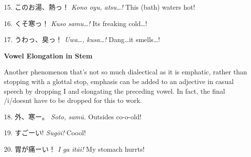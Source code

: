 \par{15. このお湯、熱っ！ \hfill\break
 \emph{Kono oyu, atsu…! }\hfill\break
This (bath) water\textquotesingle s hot! }
 
\par{16. くそ寒っ！ \hfill\break
 \emph{Kuso samu…! }\hfill\break
It\textquotesingle s freaking cold…! }
 
\par{17. うわっ、臭っ！ \hfill\break
 \emph{Uwa…, kusa…! }\hfill\break
Dang…it smells…! }
 
\begin{center}
\textbf{Vowel Elongation in Stem }
\end{center}

\par{ Another phenomenon that's not so much dialectical as it is emphatic, rather than stopping with a glottal stop, emphasis can be added to an adjective in casual speech by dropping I and elongating the preceding vowel. In fact, the final \slash i\slash  doesn\textquotesingle t have to be dropped for this to work. }
 
\par{18. 外、寒ー。 \hfill\break
 \emph{Soto, samū. }\hfill\break
Outside\textquotesingle s co-o-old! }
 
\par{19. すごーい! \hfill\break
 \emph{Sugōi! }\hfill\break
Coool! }
 
\par{20. 胃が痛ーい！ \hfill\break
 \emph{I ga itāi! }\hfill\break
My stomach hurrts! }
    